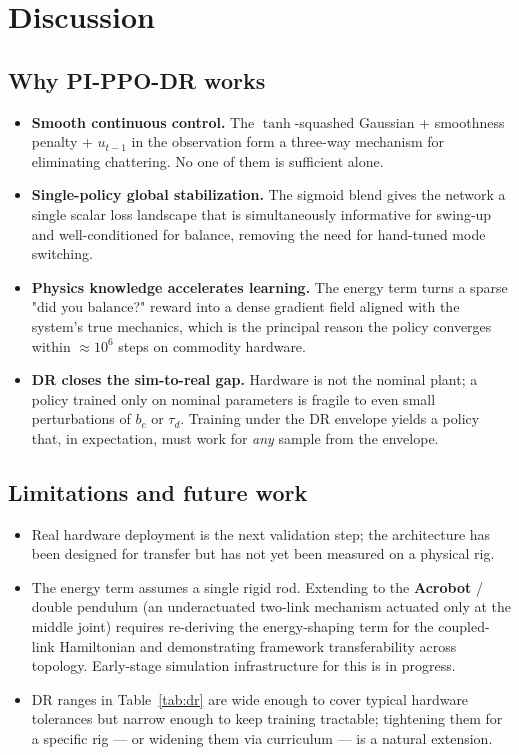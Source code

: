 \documentclass[11pt,a4paper]{article}
\begin{document}
\section{Discussion}

\subsection{Why PI-PPO-DR works}
\begin{itemize}[leftmargin=*]
\item \textbf{Smooth continuous control.} The $\tanh$-squashed Gaussian + smoothness penalty + $u_{t-1}$ in the observation form a three-way mechanism for eliminating chattering. No one of them is sufficient alone.
\item \textbf{Single-policy global stabilization.} The sigmoid blend gives the network a single scalar loss landscape that is simultaneously informative for swing-up and well-conditioned for balance, removing the need for hand-tuned mode switching.
\item \textbf{Physics knowledge accelerates learning.} The energy term turns a sparse "did you balance?" reward into a dense gradient field aligned with the system's true mechanics, which is the principal reason the policy converges within $\approx\!10^6$ steps on commodity hardware.
\item \textbf{DR closes the sim-to-real gap.} Hardware is not the nominal plant; a policy trained only on nominal parameters is fragile to even small perturbations of $b_c$ or $\tau_d$. Training under the DR envelope yields a policy that, in expectation, must work for \emph{any} sample from the envelope.
\end{itemize}

\subsection{Limitations and future work}
\begin{itemize}[leftmargin=*]
\item Real hardware deployment is the next validation step; the architecture has been designed for transfer but has not yet been measured on a physical rig.
\item The energy term assumes a single rigid rod. Extending to the \textbf{Acrobot} / double pendulum (an underactuated two-link mechanism actuated only at the middle joint) requires re-deriving the energy-shaping term for the coupled-link Hamiltonian and demonstrating framework transferability across topology. Early-stage simulation infrastructure for this is in progress.
\item DR ranges in Table~\ref{tab:dr} are wide enough to cover typical hardware tolerances but narrow enough to keep training tractable; tightening them for a specific rig --- or widening them via curriculum --- is a natural extension.
\end{itemize}
\end{document}
